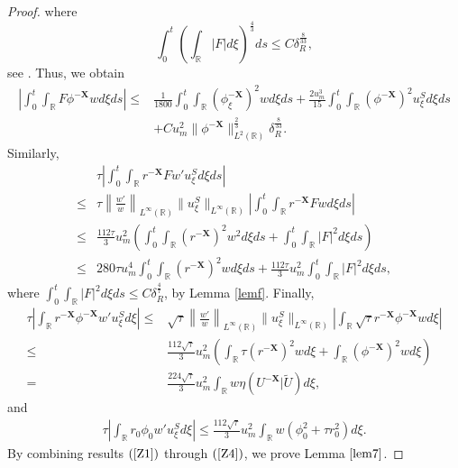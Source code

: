 \documentclass[10pt,reqno]{amsart}
\numberwithin{equation}{section}
\begin{document}
\begin{proof}
		where
		\begin{equation} \label{F}
			\int_{0}^t\left( \int_{\mathbb{R}} |F| d\xi \right)^{\frac{4}{3}}ds \leq C\delta_R^{\frac{8}{33}},
		\end{equation}
		see \cite{ref16}. Thus, we obtain
		\begin{equation}\label{Z1}
			\begin{aligned}
				\left| \int_{0}^t\int_{\mathbb{R}} F \phi^{-\mathbf{X}} w d\xi ds\right| \leq&\frac{1}{1800}\int_{0}^t\int_{\mathbb{R}} \left(\phi_{\xi}^{-\mathbf{X}}\right)^2wd\xi ds+\frac{2u_m^3}{15}\int_{0}^t\int_{\mathbb{R}}\left(\phi^{-\mathbf{X}}\right)^2u_{\xi}^Sd\xi ds\\
				&+Cu_m^2\| \phi^{-\mathbf{X}} \|_{L^2(\mathbb{R})}^{\frac{2}{3}}\delta_{R}^{\frac{8}{33}}.
			\end{aligned}
		\end{equation}
		Similarly,
		\begin{equation}\label{Z2}
			\begin{aligned}
				&\tau\left|\int_{0}^t\int_{\mathbb{R}}r^{-\mathbf{X}}Fw'u_{\xi}^{S}d\xi ds\right|\\
				\leq&\tau\left\lVert\frac{w'}{w}\right\rVert_{L^{\infty}(\mathbb{R})}\lVert u_{\xi}^S\rVert_{L^{\infty}(\mathbb{R})}\left|\int_{0}^t\int_{\mathbb{R}}r^{-\mathbf{X}}Fwd\xi ds\right|\\
				\leq&\frac{112\tau}{3}u_m^2\left(\int_{0}^t\int_{\mathbb{R}}(r^{-\mathbf{X}})^2w^2d\xi ds+\int_{0}^t\int_{\mathbb{R}}|F|^2d\xi ds\right)\\
				\leq&280\tau u_m^4\int_{0}^t\int_{\mathbb{R}}(r^{-\mathbf{X}})^2wd\xi ds+\frac{112\tau}{3}u_m^2\int_{0}^t\int_{\mathbb{R}}|F|^2d\xi ds,
			\end{aligned}
		\end{equation}
		where $\int_{0}^t\int_{\mathbb{R}}|F|^2d\xi ds\leq C\delta_{R}^{\frac{4}{7}}$, by Lemma \ref{lemf}. Finally, 
		\begin{equation}\label{Z3}
			\begin{aligned}
				\tau\left|\int_{\mathbb{R}}r^{-\mathbf{X}}\phi^{-\mathbf{X}}w'u_{\xi}^{S}d\xi\right|\leq&\sqrt{\tau}\left\lVert\frac{w'}{w}\right\rVert_{L^{\infty}(\mathbb{R})}\|u_{\xi}^{S}\|_{L^{\infty}(\mathbb{R})}\left|\int_{\mathbb{R}}\sqrt{\tau}r^{-\mathbf{X}}\phi^{-\mathbf{X}}wd\xi\right|\\
				\leq&\frac{112\sqrt{\tau}}{3}u_m^2\left(\int_{\mathbb{R}}\tau(r^{-\mathbf{X}})^2wd\xi+\int_{\mathbb{R}}(\phi^{-\mathbf{X}})^2wd\xi\right)\\
				=&\frac{224\sqrt{\tau}}{3}u_m^2\int_{\mathbb{R}}w\eta(U^{-\mathbf{X}}|\tilde{U})d\xi,
			\end{aligned}
		\end{equation}
		and
		\begin{equation}\label{Z4}
			\begin{aligned}
				\tau\left|\int_{\mathbb{R}}r_0\phi_0w'u_{\xi}^{S}d\xi\right|\leq\frac{112\sqrt{\tau}}{3}u_m^2\int_{\mathbb{R}}w\left(\phi_{0}^2+\tau r_0^2\right)d\xi.
			\end{aligned}
		\end{equation}
		By combining results $(\ref{Z1})$ through $(\ref{Z4})$, we prove Lemma $\ref{lem7}$.
	\end{proof}
\end{document}
